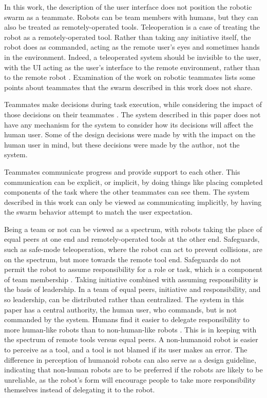 In this work, the description of the user interface does not position the robotic swarm as a teammate. 
Robots can be team members with humans, but they can also be treated as remotely-operated tools. 
Teleoperation is a case of treating the robot as a remotely-operated tool. 
Rather than taking any initiative itself, the robot does as commanded, acting as the remote user's eyes and sometimes hands in the environment. 
Indeed, a teleoperated system should be invisible to the user, with the UI acting as the user's interface to the remote environment, rather than to the remote robot \citep{larochelle2011establishing}.
Examination of the work on robotic teammates lists some points about teammates that the swarm described in this work does not share.  

Teammates make decisions during task execution, while considering the impact of those decisions on their teammates \citep{shah2011improved}. 
The system described in this paper does not have any mechanism for the system to consider how its decisions will affect the human user. 
Some of the design decisions were made by with the impact on the human user in mind, but these decisions were made by the author, not the system. 

Teammates communicate progress and provide support  to each other. 
This communication can be explicit, or implicit, by doing things like placing completed components of the task where the other teammates can see them. 
The system described in this work can only be viewed as communicating implicitly, by having the swarm behavior attempt to match the user expectation. 

Being a team or not can be viewed as a spectrum, with robots taking the place of equal peers at one end and remotely-operated tools at the other end. 
Safeguards, such as safe-mode teleoperation, where the robot can act to prevent collisions, are on the spectrum, but more towards the remote tool end. 
Safeguards do not permit the robot to assume responsibility for a role or task, which is a component of team membership \citep{bruemmer2005shared}. 
Taking initiative combined with assuming responsibility is the basis of leadership.
In a team of equal peers, initiative and responsibility, and so leadership, can be distributed rather than centralized. 
The system in this paper has a central authority, the human user, who commands, but is not commanded by the system. 
Humans find it easier to delegate responsibility to more human-like robots than to non-human-like robots \citep{hinds2004whose}. 
This is in keeping with the spectrum of remote tools versus equal peers. 
A non-humanoid robot is easier to perceive as a tool, and a tool is not blamed if its user makes an error. 
The difference in perception of humanoid robots can also serve as a design guideline, indicating that non-human robots are to be preferred if the robots are likely to be unreliable, as the robot's form will encourage people to take more responsibility themselves instead of delegating it to the robot. 

